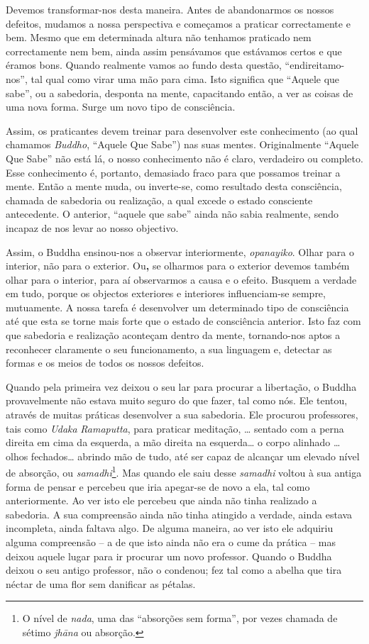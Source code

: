 Devemos transformar-nos desta maneira. Antes de abandonarmos os nossos
defeitos, mudamos a nossa perspectiva e começamos a praticar
correctamente e bem. Mesmo que em determinada altura não tenhamos
praticado nem correctamente nem bem, ainda assim pensávamos que
estávamos certos e que éramos bons. Quando realmente vamos ao fundo
desta questão, ``endireitamo-nos'', tal qual como virar uma mão para
cima. Isto significa que ``Aquele que sabe'', ou a sabedoria, desponta
na mente, capacitando então, a ver as coisas de uma nova forma. Surge um
novo tipo de consciência.

Assim, os praticantes devem treinar para desenvolver este conhecimento
(ao qual chamamos \emph{Buddho}, ``Aquele Que Sabe'') nas suas mentes.
Originalmente ``Aquele Que Sabe'' não está lá, o nosso conhecimento não
é claro, verdadeiro ou completo. Esse conhecimento é, portanto,
demasiado fraco para que possamos treinar a mente. Então a mente muda,
ou inverte-se, como resultado desta consciência, chamada de sabedoria ou
realização, a qual excede o estado consciente antecedente. O anterior,
``aquele que sabe'' ainda não sabia realmente, sendo incapaz de nos
levar ao nosso objectivo.

Assim, o Buddha ensinou-nos a observar interiormente, \emph{opanayiko}.
Olhar para o interior, não para o exterior. Ou\textbf{,} se olharmos
para o exterior devemos também olhar para o interior, para aí
observarmos a causa e o efeito. Busquem a verdade em tudo, porque os
objectos exteriores e interiores influenciam-se sempre, mutuamente. A
nossa tarefa é desenvolver um determinado tipo de consciência até que
esta se torne mais forte que o estado de consciência anterior. Isto faz
com que sabedoria e realização aconteçam dentro da mente, tornando-nos
aptos a reconhecer claramente o seu funcionamento, a sua linguagem e,
detectar as formas e os meios de todos os nossos defeitos.

Quando pela primeira vez deixou o seu lar para procurar a libertação, o
Buddha provavelmente não estava muito seguro do que fazer, tal como nós.
Ele tentou, através de muitas práticas desenvolver a sua sabedoria. Ele
procurou professores, tais como \emph{Udaka} \emph{Ramaputta}, para
praticar meditação, \ldots{} sentado com a perna direita em cima da
esquerda, a mão direita na esquerda\ldots{} o corpo alinhado \ldots{}
olhos fechados\ldots{} abrindo mão de tudo, até ser capaz de alcançar um
elevado nível de absorção, ou \emph{samadhi}\footnote{%
  O nível de \emph{nada}, uma das ``absorções sem forma'', por vezes
  chamada de sétimo \emph{jhāna} ou absorção.}.
Mas quando ele saiu
desse \emph{samadhi} voltou à sua antiga forma de pensar e percebeu que
iria apegar-se de novo a ela, tal como anteriormente. Ao ver isto ele
percebeu que ainda não tinha realizado a sabedoria. A sua compreensão
ainda não tinha atingido a verdade, ainda estava incompleta, ainda
faltava algo. De alguma maneira, ao ver isto ele adquiriu alguma
compreensão -- a de que isto ainda não era o cume da prática -- mas
deixou aquele lugar para ir procurar um novo professor. Quando o Buddha
deixou o seu antigo professor, não o condenou; fez tal como a abelha que
tira néctar de uma flor sem danificar as pétalas.

